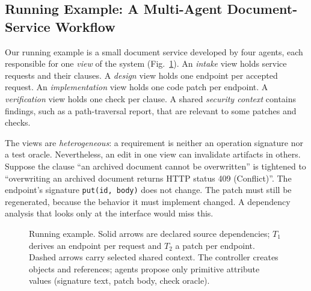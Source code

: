 \documentclass[10pt,journal,compsoc]{IEEEtran}
\theoremstyle{plain}
\theoremstyle{definition}
\begin{document}
\subsection{Running Example: A Multi-Agent Document-Service Workflow}\label{sec:motivation}
Our running example is a small document service developed by four agents, each responsible for one \emph{view} of the system (Fig.~\ref{fig:network}). An \emph{intake} view holds service requests and their clauses. A \emph{design} view holds one endpoint per accepted request. An \emph{implementation} view holds one code patch per endpoint. A \emph{verification} view holds one check per clause. A shared \emph{security context} contains findings, such as a path-traversal report, that are relevant to some patches and checks.

The views are \emph{heterogeneous}: a requirement is neither an operation signature nor a test oracle. Nevertheless, an edit in one view can invalidate artifacts in others. Suppose the clause ``an archived document cannot be overwritten'' is tightened to ``overwriting an archived document returns HTTP status 409 (Conflict)''. The endpoint's signature \texttt{put(id, body)} does not change. The patch must still be regenerated, because the behavior it must implement changed. A dependency analysis that looks only at the interface would miss this.

\begin{figure}[!t]
\centering
{}%
\caption{Running example. Solid arrows are declared source dependencies; $T_1$ derives an endpoint per request and $T_2$ a patch per endpoint. Dashed arrows carry selected shared context. The controller creates objects and references; agents propose only primitive attribute values (signature text, patch body, check oracle).}\label{fig:network}
\end{figure}
\end{document}
